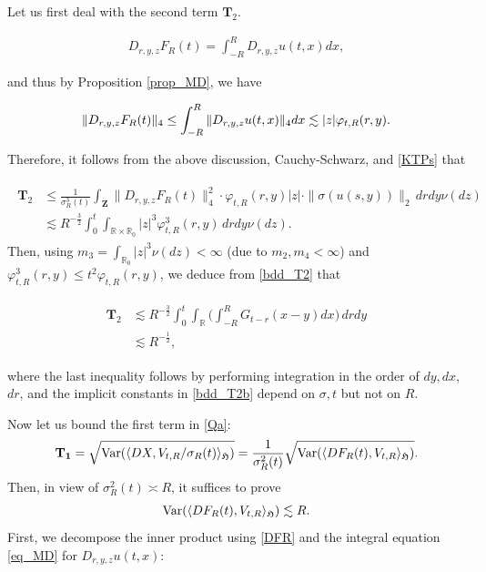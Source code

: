 \documentclass[letterpaper, 11pt,  reqno]{amsart}
\newcommand{\noi}{\noindent}
\newcommand{\R}{\mathbb{R}}
\newcommand{\s}{\sigma}
\newcommand{\les}{\lesssim}
\newcommand{\jb}[1]
{\langle #1 \rangle}
\newcommand{\Var}{\textup{Var}}
\newcommand{\fH}{\mathfrak{H}}
\numberwithin{equation}{section}
\numberwithin{theorem}{section}
\begin{document}
\noi
Let us first deal with the second term $\mathbf{T}_2 $.


\noi
\begin{align}\label{DFR}
D_{r,y,z}F_R(t) = \int_{-R}^{R}D_{r,y,z}u(t,x)dx,
\end{align}

\noi
and thus by Proposition \ref{prop_MD}, we have 

\noi
\begin{align}  \notag%
\| D_{r,y,z}F_R(t)  \|_4 \leq   \int_{-R}^{R} \| D_{r,y,z}u(t,x )\|_4 dx 
\les |z|   \varphi_{t, R}(r, y)  .
\end{align}

\noi
Therefore, it follows from the above discussion, Cauchy-Schwarz, and  \eqref{KTPs} that 

\noi
\begin{align}\label{bdd_T2}
\begin{aligned}
 \mathbf{T}_2
& \leq \frac{1}{\s^3_R(t)}\int_{\mathbf{Z}}  \| D_{r,y,z}F_R(t)  \|^2_4 
 \cdot   \varphi_{t, R}(r, y)   |z| \cdot \| \s( u(s,y) ) \|_2 \, drdy \nu(dz) \\
 &\les R^{-\frac32} \int_0^t\int_{\R\times\R_0} |z|^3  \varphi^3_{t, R}(r, y) 
 \, drdy \nu(dz).
\end{aligned}
\end{align}
Then, using $m_3 = \int_{\R_0} |z|^3 \nu(dz) < \infty$ (due to $m_2, m_4 <\infty$)
and 
$  \varphi^3_{t, R}(r, y) \leq  t^2   \varphi_{t, R}(r, y)$,
we deduce from \eqref{bdd_T2} that 

\noi
\begin{align}\label{bdd_T2b}
\begin{aligned}
 \mathbf{T}_2
& \les R^{-\frac32} \int_0^t \int_\R   \bigg(  \int_{-R}^R G_{t-r}(x-y) dx  \bigg)
 \, drdy \\
& \les R^{-\frac12},
\end{aligned}
\end{align}

\noi
where the last inequality follows by performing integration in the order
of $dy, dx$, $dr$, and the implicit constants in  \eqref{bdd_T2b}
  depend on $\s, t$ but not  on $R$.

\smallskip



Now let us bound the first term   in \eqref{Qa}:
\begin{align} \notag
\mathbf{T_1} = \sqrt{\Var( \jb{ DX,  V_{t, R}/\s_R(t) }_\fH)}
= \frac{1}{\s^2_R(t)} \sqrt{  \Var( \jb{ DF_R(t),  V_{t, R} }_\fH)}.
\end{align}
Then, in view of $\s^2_R(t)\asymp R$,
 it suffices to prove
\begin{align} \label{bdd_T1a}
 \Var( \jb{ DF_R(t),  V_{t, R} }_\fH) \les  R.
\end{align}
First, we decompose the inner product using \eqref{DFR} and
 the integral equation \eqref{eq_MD}
for $D_{r, y, z} u(t,x)$:
\end{document}
